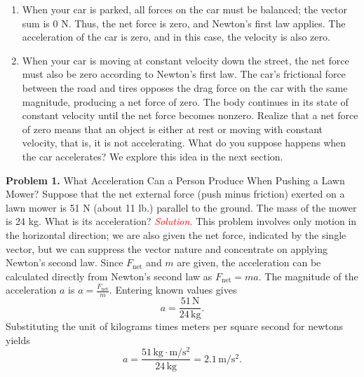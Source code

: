 \documentclass{report}
\begin{document}
    \begin{enumerate}[label=(\alph*)]
        \item When your car is parked, all forces on the car must be balanced; the vector sum is 0 N. Thus, the net force is zero, and Newton’s first law applies. The acceleration of the car is zero, and in this case, the velocity is also zero.
        \item When your car is moving at constant velocity down the street, the net force must also be zero according to Newton’s first law. The car’s frictional force between the road and tires opposes the drag force on the car with the same magnitude, producing a net force of zero. The body continues in its state of constant velocity until the net force becomes nonzero. Realize that a net force of zero means that an object is either at rest or moving with constant velocity, that is, it is not accelerating. What do you suppose happens when the car accelerates? We explore this idea in the next section.
    \end{enumerate}

    \pagebreak 
    \bigbreak \noindent 
    \textbf{Problem 1.} What Acceleration Can a Person Produce When Pushing a Lawn Mower?
    \bigbreak \noindent 
    Suppose that the net external force (push minus friction) exerted on a lawn mower is 51 N (about 11 lb.) parallel to the ground. The mass of the mower is 24 kg. What is its acceleration?
    \bigbreak \noindent 
    \bigbreak \noindent 
    \textcolor{red}{\textit{Solution.}} This problem involves only motion in the horizontal direction; we are also given the net force, indicated by the single vector, but we can suppress the vector nature and concentrate on applying Newton's second law. Since $F_{\text{net}}$ and $m$ are given, the acceleration can be calculated directly from Newton's second law as $F_{\text{net}} = ma$.
    \bigbreak \noindent 
    The magnitude of the acceleration $a$ is $a = \frac{F_{\text{net}}}{m}$. Entering known values gives
    \[ a = \frac{51\, \text{N}}{24\, \text{kg}}. \]
    Substituting the unit of kilograms times meters per square second for newtons yields
    \[ a = \frac{51\, \text{kg} \cdot \text{m}/\text{s}^2}{24\, \text{kg}} = 2.1\, \text{m}/\text{s}^2. \]
\end{document}
